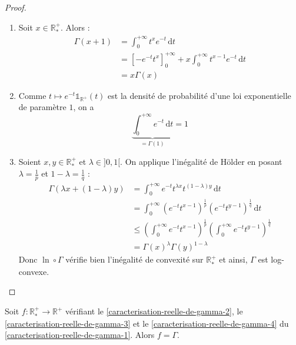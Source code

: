   \begin{proof}
    \begin{enumerate}[label=(\roman*)]
      \item Soit $x \in \mathbb{R}^+_*$. Alors :
      \begin{align*}
        \Gamma(x+1) &= \int_0^{+\infty} t^x e^{-t} \, \mathrm{d}t \\
        &= \left[ -e^{-t} t^x \right]_0^{+\infty} + x \int_0^{+\infty} t^{x-1} e^{-t} \, \mathrm{d}t \\
        &= x\Gamma(x)
      \end{align*}
      \item Comme $t \mapsto e^{-t} \mathbb{1}_{\mathbb{R}^+}(t)$ est la densité de probabilité d'une loi exponentielle de paramètre $1$, on a
      \[ \underbrace{\int_0^{+\infty} e^{-t} \, \mathrm{d}t}_{= \Gamma(1)} = 1 \]
      \item Soient $x, y \in \mathbb{R}^+_*$ et $\lambda \in ]0, 1[$. On applique l'inégalité de Hölder en posant $\lambda = \frac{1}{p}$ et $1-\lambda = \frac{1}{q}$ :
      \begin{align*}
        \Gamma(\lambda x + (1-\lambda) y) &= \int_0^{+\infty} e^{-t} t^{\lambda x} t^{(1-\lambda)y} \, \mathrm{d}t \\
        &= \int_0^{+\infty} (e^{-t} t^{x-1})^{\frac{1}{p}} (e^{-t} t^{y-1})^{\frac{1}{q}} \, \mathrm{d}t \\
        &\leq \left (\int_0^{+\infty} e^{-t} t^{x-1} \right)^{\frac{1}{p}} \left (\int_0^{+\infty} e^{-t} t^{y-1} \right)^{\frac{1}{q}} \\
        &= \Gamma(x)^\lambda \Gamma(y)^{1-\lambda}
      \end{align*}
      Donc $\ln \circ \Gamma$ vérifie bien l'inégalité de convexité sur $\mathbb{R}^+_*$ et ainsi, $\Gamma$ est log-convexe.
    \end{enumerate}
  \end{proof}

  \begin{theorem}
    Soit $f : \mathbb{R}^+_* \rightarrow \mathbb{R}^+$ vérifiant le \cref{caracterisation-reelle-de-gamma-2}, le \cref{caracterisation-reelle-de-gamma-3} et le \cref{caracterisation-reelle-de-gamma-4} du \cref{caracterisation-reelle-de-gamma-1}. Alors $f = \Gamma$.
  \end{theorem}

